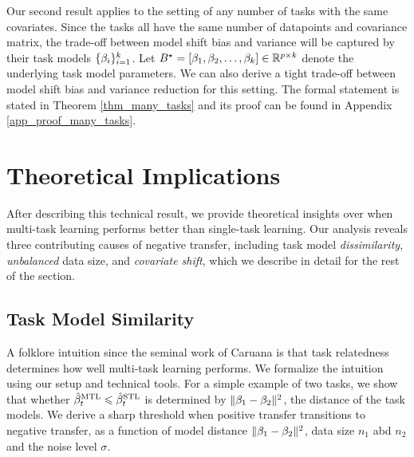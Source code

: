 Our second result applies to the setting of any number of tasks with the same covariates.
Since the tasks all have the same number of datapoints and covariance matrix, the trade-off between model shift bias and variance will be captured by their task models $\{\beta_i\}_{i=1}^k$.
Let $B^{\star} = [\beta_1, \beta_2, \dots, \beta_k] \in\mathbb{R}^{p\times k}$ denote the underlying task model parameters.
We can also derive a tight trade-off between model shift bias and variance reduction for this setting.
The formal statement is stated in Theorem \ref{thm_many_tasks} and its proof can be found in Appendix \ref{app_proof_many_tasks}.


\section{Theoretical Implications}
\label{sec_insight}
After describing this technical result, we provide theoretical insights over when multi-task learning performs better than single-task learning.
Our analysis reveals three contributing causes of negative transfer, including task model \textit{dissimilarity}, \textit{unbalanced} data size, and \textit{covariate shift}, which we describe in detail for the rest of the section.


\subsection{Task Model Similarity}\label{sec_similarity}

A folklore intuition since the seminal work of Caruana \cite{C97} is that task relatedness determines how well multi-task learning performs.
We formalize the intuition using our setup and technical tools.
For a simple example of two tasks, we show that whether $\hat{\beta}_t^{\text{MTL}} \leqslant \hat{\beta}_t^{\text{STL}}$ is determined by $\|\beta_1 - \beta_2\|^2$, the distance of the task models.
We derive a sharp threshold when positive transfer transitions to negative transfer, as a function of model distance $\|\beta_1 - \beta_2\|^2$, data size $n_1$ abd $n_2$ and the noise level $\sigma$.

